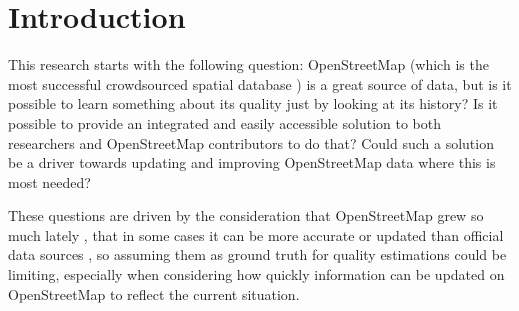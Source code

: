 \documentclass{Configuration_Files/PoliMi3i_thesis}
\begin{document}
\mainmatter %

\chapter*{Introduction}
\begin{quote}
\end{quote}


This research starts with the following question: OpenStreetMap (which is the most successful crowdsourced spatial database \cite{foodyMappingCitizenSensor2017}) is a great source of data, but is it possible to learn something about its quality just by looking at its history? Is it possible to provide an integrated and easily accessible solution to both researchers and OpenStreetMap contributors to do that? Could such a solution be a driver towards updating and improving OpenStreetMap data where this is most needed?

These questions are driven by the consideration that OpenStreetMap grew so much lately \cite{openstreetmapblog100MillionEdits2021}, that in some cases it can be more accurate or updated than official data sources \cite{antoniouMeasuresIndicatorsVGI2015}, so assuming them as ground truth for quality estimations could be limiting, especially when considering how quickly information can be updated on OpenStreetMap to reflect the current situation.
\end{document}
